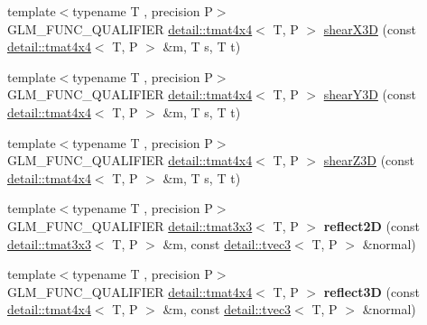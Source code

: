 \begin{DoxyCompactItemize}
\item 
{\footnotesize template$<$typename T , precision P$>$ }\\G\+L\+M\+\_\+\+F\+U\+N\+C\+\_\+\+Q\+U\+A\+L\+I\+F\+I\+ER \hyperlink{structglm_1_1detail_1_1tmat4x4}{detail\+::tmat4x4}$<$ T, P $>$ \hyperlink{group__gtx__transform2_gaae5bbb490a3d798b083cbec0e0c2e94c}{shear\+X3D} (const \hyperlink{structglm_1_1detail_1_1tmat4x4}{detail\+::tmat4x4}$<$ T, P $>$ \&m, T s, T t)
\item 
{\footnotesize template$<$typename T , precision P$>$ }\\G\+L\+M\+\_\+\+F\+U\+N\+C\+\_\+\+Q\+U\+A\+L\+I\+F\+I\+ER \hyperlink{structglm_1_1detail_1_1tmat4x4}{detail\+::tmat4x4}$<$ T, P $>$ \hyperlink{group__gtx__transform2_ga4b5af90ecf76d312bb371f6111e1ae35}{shear\+Y3D} (const \hyperlink{structglm_1_1detail_1_1tmat4x4}{detail\+::tmat4x4}$<$ T, P $>$ \&m, T s, T t)
\item 
{\footnotesize template$<$typename T , precision P$>$ }\\G\+L\+M\+\_\+\+F\+U\+N\+C\+\_\+\+Q\+U\+A\+L\+I\+F\+I\+ER \hyperlink{structglm_1_1detail_1_1tmat4x4}{detail\+::tmat4x4}$<$ T, P $>$ \hyperlink{group__gtx__transform2_ga02fa747667daf42b64ea344d1076acee}{shear\+Z3D} (const \hyperlink{structglm_1_1detail_1_1tmat4x4}{detail\+::tmat4x4}$<$ T, P $>$ \&m, T s, T t)
\item 
{\footnotesize template$<$typename T , precision P$>$ }\\G\+L\+M\+\_\+\+F\+U\+N\+C\+\_\+\+Q\+U\+A\+L\+I\+F\+I\+ER \hyperlink{structglm_1_1detail_1_1tmat3x3}{detail\+::tmat3x3}$<$ T, P $>$ {\bfseries reflect2D} (const \hyperlink{structglm_1_1detail_1_1tmat3x3}{detail\+::tmat3x3}$<$ T, P $>$ \&m, const \hyperlink{structglm_1_1detail_1_1tvec3}{detail\+::tvec3}$<$ T, P $>$ \&normal)\hypertarget{namespaceglm_a8da591eb7bc7747abb311d91162e0e13}{}\label{namespaceglm_a8da591eb7bc7747abb311d91162e0e13}

\item 
{\footnotesize template$<$typename T , precision P$>$ }\\G\+L\+M\+\_\+\+F\+U\+N\+C\+\_\+\+Q\+U\+A\+L\+I\+F\+I\+ER \hyperlink{structglm_1_1detail_1_1tmat4x4}{detail\+::tmat4x4}$<$ T, P $>$ {\bfseries reflect3D} (const \hyperlink{structglm_1_1detail_1_1tmat4x4}{detail\+::tmat4x4}$<$ T, P $>$ \&m, const \hyperlink{structglm_1_1detail_1_1tvec3}{detail\+::tvec3}$<$ T, P $>$ \&normal)\hypertarget{namespaceglm_a1c0b4d42e9d4230035d2ffb1d4296a4a}{}\label{namespaceglm_a1c0b4d42e9d4230035d2ffb1d4296a4a}


\end{DoxyCompactItemize}
